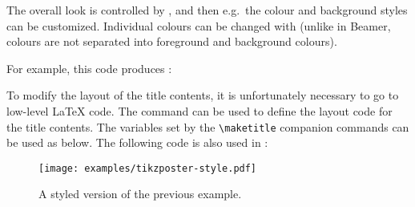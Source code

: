 The overall look is controlled by ,
and then e.g.\ the colour and background styles can be customized.
Individual colours can be changed with 
(unlike in Beamer, colours are not separated into foreground and background colours).

For example, this code produces :
\begin{ExampleCode}

\end{ExampleCode}

To modify the layout of the title contents,
it is unfortunately necessary to go to low-level \LaTeX{} code.
The  command can be used to define the layout code for the title contents.
The variables set by the \verb|\maketitle| companion commands can be used as below.
The following code is also used in :
%
\begin{ExampleCode}
\settitle{
    \makebox[8cm][c]{\@titlegraphic}
    \parbox[b]{20cm}{
        \color{titlefgcolor} {\bfseries \Huge \sc \@title \par}
        \vspace*{1em}
        {\huge \@author{} \Large (\@institute)}
    }
}
\end{ExampleCode}

\begin{figure}
\centering
\texttt{[image: examples/tikzposter-style.pdf]}
\caption{A styled version of the previous example.}\label{fig:poster styled}
\end{figure}

